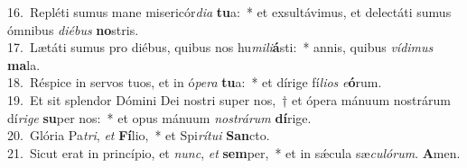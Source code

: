 {16.~}Repléti sumus mane misericór\textit{di}\textit{a} \textbf{tu}a:~* et exsultávimus, et delectáti sumus ómnibus \textit{di}\textit{é}\textit{bus} \textbf{no}stris.\\
{17.~}Lætáti sumus pro diébus, quibus nos hu\textit{mi}\textit{li}\textbf{á}sti:~* annis, quibus \textit{ví}\textit{di}\textit{mus} \textbf{ma}la.\\
{18.~}Réspice in servos tuos, et in ó\textit{pe}\textit{ra} \textbf{tu}a:~* et dírige fí\textit{li}\textit{os} \textit{e}\textbf{ó}rum.\\
{19.~}Et sit splendor Dómini Dei nostri super nos,~† et ópera mánuum nostrárum dí\textit{ri}\textit{ge} \textbf{su}per nos:~* et opus mánuum \textit{no}\textit{strá}\textit{rum} \textbf{dí}rige.\\
{20.~}Glória Pa\textit{tri}, \textit{et} \textbf{Fí}lio,~* et Spi\textit{rí}\textit{tu}\textit{i} \textbf{San}cto.\\
{21.~}Sicut erat in princípio, et \textit{nunc}, \textit{et} \textbf{sem}per,~* et in sǽcula sæ\textit{cu}\textit{ló}\textit{rum}. \textbf{A}men.\\
